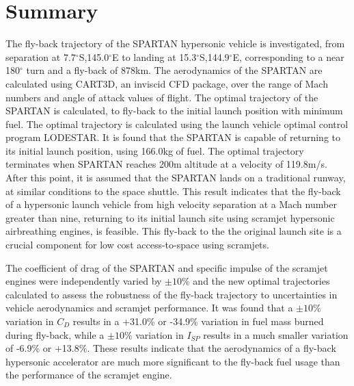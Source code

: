 \section{Summary}
The fly-back trajectory of the SPARTAN hypersonic vehicle is investigated, from separation at 7.7$^\circ$S,145.0$^\circ$E to landing at 15.3$^\circ$S,144.9$^\circ$E, corresponding to a near 180$^\circ$ turn and a fly-back of 878km. The aerodynamics of the SPARTAN are calculated using CART3D, an inviscid CFD package, over the range of Mach numbers and angle of attack values of flight. The optimal trajectory of the SPARTAN is calculated, to fly-back to the initial launch position with minimum fuel. The optimal trajectory is calculated using the launch vehicle optimal control program LODESTAR. It is found that the SPARTAN is capable of returning to its initial launch position, using 166.0kg of fuel. The optimal trajectory terminates when SPARTAN reaches 200m altitude at a velocity of 119.8m/s. After this point, it is assumed that the SPARTAN lands on a traditional runway, at similar conditions to the space shuttle.  
This result indicates that the fly-back of a hypersonic launch vehicle from high velocity separation at a Mach number greater than nine, returning to its initial launch site using scramjet hypersonic airbreathing engines, is feasible. This fly-back to the the original launch site is a crucial component for low cost access-to-space using scramjets. 

The coefficient of drag of the SPARTAN and specific impulse of the scramjet engines were independently varied by $\pm10\%$ and the new optimal trajectories calculated to assess the robustness of the fly-back trajectory to uncertainties in vehicle aerodynamics and scramjet performance. It was found that a $\pm10\%$ variation in $C_D$ results in a +31.0\% or -34.9\% variation in fuel mass burned during fly-back, while a $\pm10\%$ variation in $I_{SP}$ results in a much smaller variation of -6.9\% or +13.8\%. These results indicate that the aerodynamics of a fly-back hypersonic accelerator are much more significant to the fly-back fuel usage than the performance of the scramjet engine. 

